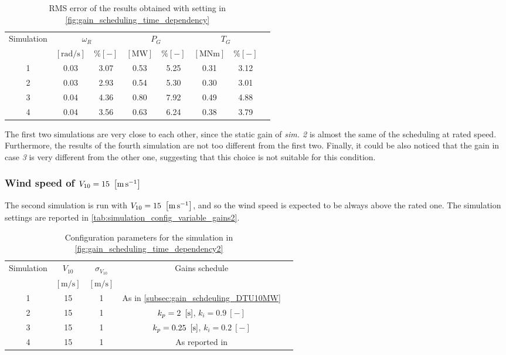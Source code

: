 \begin{table}[htb]
  \caption{RMS error of the results obtained with setting in \autoref{fig:gain_scheduling_time_dependency}}
  \centering
  \begin{tabular}{cccccccc}
    \toprule
      Simulation & \multicolumn{2}{c}{$\omega_R$} & \multicolumn{2}{c}{$P_G$} & \multicolumn{2}{c}{$T_G$} \\ 
       & $\left[\si{\radian\per\second}\right]$ & $ \% \left[-\right]$ & $\left[\si{\mega\watt}\right]$ & $ \% \left[-\right]$ & $\left[\si{\mega\newton\meter} \right]$ & $ \% \left[-\right]$ \\ \midrule       
       1 &  0.03 &  3.07 &  0.53  &  5.25  &  0.31  &  3.12 \\
       2 &  0.03 &  2.93 &  0.54  &  5.30  &  0.30  &  3.01 \\
       3 &  0.04 &  4.36 &  0.80  &  7.92  &  0.49  &  4.88 \\
       4 &  0.04 &  3.56 &  0.63  &  6.24  &  0.38  &  3.79 \\
     \bottomrule
  \end{tabular}
  \label{tab:res_variable_gains}
\end{table}

The first two simulations are very close to each other, since the static gain of \textit{sim. 2} is almost the same of the scheduling at rated speed. Furthermore, the results of the fourth simulation are not too different from the first two. Finally, it could be also noticed that the gain in case \textit{3} is very different from the other one, suggesting that this choice is not suitable for this condition. 

\subsubsection{Wind speed of $V_{10}=15 \ \left[\si{\meter\per\second}\right]$}
The second simulation is run with $V_{10}=15 \ \left[\si{\meter\per\second}\right]$, and so the wind speed is expected to be always above the rated one. The simulation settings are reported in \autoref{tab:simulation_config_variable_gains2}.
\begin{table}[htb]
  \caption{Configuration parameters for the simulation in \autoref{fig:gain_scheduling_time_dependency2}}
  \centering
  \begin{tabular}{ccccc}
  \toprule
    Simulation & $V_{10}$  & $\sigma_{V_{10}}$ & Gains schedule \\ 
     & $\left[\si{\meter\per\second}\right]$ & $\left[\si{\meter\per\second}\right]$ & \\ \midrule       
     1 & 15 & 1 & As in \autoref{subsec:gain_schdeuling_DTU10MW}  \\
     2 & 15 & 1 & $k_p = 2 \ \mesunt{\second}$, $k_i=0.9 \ [-]$ \\
     3 & 15 & 1 & $k_p = 0.25 \ \mesunt{\second}$, $k_i=0.2 \ [-]$  \\
     4 & 15 & 1 & As reported in \cite{Olimpo_Anaya‐Lara}  \\
     \bottomrule
  \end{tabular}
  \label{tab:simulation_config_variable_gains2}
\end{table}

